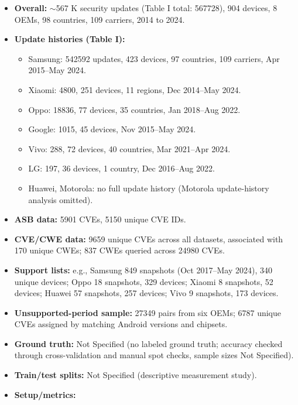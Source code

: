 \documentclass[11pt,a4paper]{article}
\begin{document}
\begin{enumerate}
    \begin{itemize}[leftmargin=*,itemsep=1pt,topsep=2pt]
        \item \textbf{Overall:} $\sim$567 K security updates (Table I total: 567728), 904 devices, 8 OEMs, 98 countries, 109 carriers, 2014 to 2024.
        \item \textbf{Update histories (Table I):}
        \begin{itemize}[itemsep=0pt]
            \item Samsung: 542592 updates, 423 devices, 97 countries, 109 carriers, Apr 2015--May 2024.
            \item Xiaomi: 4800, 251 devices, 11 regions, Dec 2014--May 2024.
            \item Oppo: 18836, 77 devices, 35 countries, Jan 2018--Aug 2022.
            \item Google: 1015, 45 devices, Nov 2015--May 2024.
            \item Vivo: 288, 72 devices, 40 countries, Mar 2021--Apr 2024.
            \item LG: 197, 36 devices, 1 country, Dec 2016--Aug 2022.
            \item Huawei, Motorola: no full update history (Motorola update-history analysis omitted).
        \end{itemize}
        \item \textbf{ASB data:} 5901 CVEs, 5150 unique CVE IDs.
        \item \textbf{CVE/CWE data:} 9659 unique CVEs across all datasets, associated with 170 unique CWEs; 837 CWEs queried across 24980 CVEs.
        \item \textbf{Support lists:} e.g., Samsung 849 snapshots (Oct 2017--May 2024), 340 unique devices; Oppo 18 snapshots, 329 devices; Xiaomi 8 snapshots, 52 devices; Huawei 57 snapshots, 257 devices; Vivo 9 snapshots, 173 devices.
        \item \textbf{Unsupported-period sample:} 27349 pairs from six OEMs; 6787 unique CVEs assigned by matching Android versions and chipsets.
        \item \textbf{Ground truth:} Not Specified (no labeled ground truth; accuracy checked through cross-validation and manual spot checks, sample sizes Not Specified).
        \item \textbf{Train/test splits:} Not Specified (descriptive measurement study).
        \item \textbf{Setup/metrics:}
        \begin{itemize}[itemsep=0pt]

\end{itemize}
\end{itemize}
\end{enumerate}
\end{document}
